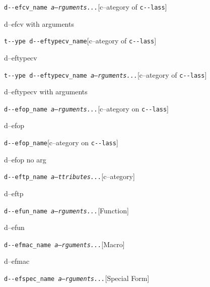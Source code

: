 \documentclass{book}
\begin{document}
\begin{titlepage}
\noindent\texttt{d{-}{-}efcv\_name \bgroup{}\normalfont{}\textsl{a--rguments...}\egroup{}}\hfill[c--ategory of \texttt{c{-}{-}lass}]



%
d--efcv with arguments

\noindent\texttt{t{-}{-}ype d{-}{-}eftypecv\_name}\hfill[c--ategory of \texttt{c{-}{-}lass}]



%
d--eftypecv

\noindent\texttt{t{-}{-}ype d{-}{-}eftypecv\_name \bgroup{}\normalfont{}\textsl{a--rguments...}\egroup{}}\hfill[c--ategory of \texttt{c{-}{-}lass}]



%
d--eftypecv with arguments

\noindent\texttt{d{-}{-}efop\_name \bgroup{}\normalfont{}\textsl{a--rguments...}\egroup{}}\hfill[c--ategory on \texttt{c{-}{-}lass}]



%
d--efop

\noindent\texttt{d{-}{-}efop\_name}\hfill[c--ategory on \texttt{c{-}{-}lass}]



%
d--efop no arg

\noindent\texttt{d{-}{-}eftp\_name \bgroup{}\normalfont{}\textsl{a--ttributes...}\egroup{}}\hfill[c--ategory]



%
d--eftp

\noindent\texttt{d{-}{-}efun\_name \bgroup{}\normalfont{}\textsl{a--rguments...}\egroup{}}\hfill[Function]



%
d--efun

\noindent\texttt{d{-}{-}efmac\_name \bgroup{}\normalfont{}\textsl{a--rguments...}\egroup{}}\hfill[Macro]



%
d--efmac

\noindent\texttt{d{-}{-}efspec\_name \bgroup{}\normalfont{}\textsl{a--rguments...}\egroup{}}\hfill[Special Form]




\end{titlepage}
\end{document}
